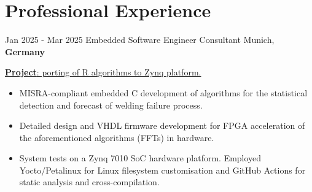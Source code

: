 \documentclass[letterpaper]{twentysecondcv} %
\begin{document}
\makeprofile %

%
%
\section{Professional Experience}

\begin{twenty} %

    \twentyitem
        {Jan 2025 -}
        {Mar 2025}
        {Embedded Software Engineer Consultant}
        {Munich, \textbf{Germany}}
        {}
        {
            \vspace{2 mm}
            \underline{\textbf{Project}: porting of R algorithms to Zynq platform.}

            \vspace{2 mm}
            \begin{itemize}
                \item MISRA-compliant embedded C development of algorithms for the statistical detection and forecast of welding failure process.
                \item Detailed design and VHDL firmware development for FPGA acceleration of the aforementioned algorithms (FFTs) in hardware.
                \item System tests on a Zynq 7010 SoC hardware platform. Employed Yocto/Petalinux for Linux filesystem customisation and GitHub Actions for static analysis and cross-compilation.
            \end{itemize}

}
\end{twenty}
\end{document}
